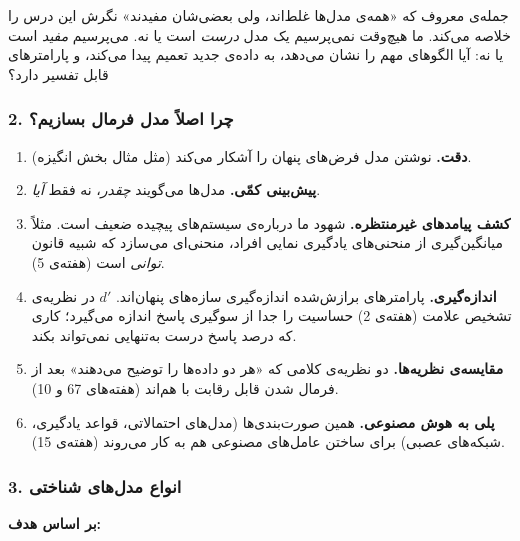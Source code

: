 جمله‌ی معروف  که «همه‌ی مدل‌ها غلط‌اند، ولی بعضی‌شان مفیدند»
نگرش این درس را خلاصه می‌کند. ما هیچ‌وقت نمی‌پرسیم یک مدل \emph{درست} است
یا نه. می‌پرسیم \emph{مفید} است یا نه: آیا الگوهای مهم را نشان می‌دهد، به
داده‌ی جدید تعمیم پیدا می‌کند، و پارامترهای قابل تفسیر دارد؟

\subsubsection{2. چرا اصلاً مدل فرمال بسازیم؟}

\begin{enumerate}
\def\labelenumi{\arabic{enumi}.}
\tightlist
\item
  \textbf{دقت.} نوشتن مدل فرض‌های پنهان را آشکار می‌کند (مثل مثال بخش
  انگیزه).
\item
  \textbf{پیش‌بینی کمّی.} مدل‌ها می‌گویند \emph{چقدر}، نه فقط \emph{آیا}.
\item
  \textbf{کشف پیامدهای غیرمنتظره.} شهود ما درباره‌ی سیستم‌های پیچیده ضعیف
  است. مثلاً میانگین‌گیری از منحنی‌های یادگیری نمایی افراد، منحنی‌ای می‌سازد
  که شبیه قانون \emph{توانی} است (هفته‌ی 5).
\item
  \textbf{اندازه‌گیری.} پارامترهای برازش‌شده اندازه‌گیری سازه‌های پنهان‌اند.
  \(d'\) در نظریه‌ی تشخیص علامت (هفته‌ی 2) حساسیت را جدا از سوگیری پاسخ
  اندازه می‌گیرد؛ کاری که درصد پاسخ درست به‌تنهایی نمی‌تواند بکند.
\item
  \textbf{مقایسه‌ی نظریه‌ها.} دو نظریه‌ی کلامی که «هر دو داده‌ها را توضیح
  می‌دهند» بعد از فرمال شدن قابل رقابت با هم‌اند (هفته‌های 6\lr{--}7 و 10).
\item
  \textbf{پلی به هوش مصنوعی.} همین صورت‌بندی‌ها (مدل‌های احتمالاتی، قواعد
  یادگیری، شبکه‌های عصبی) برای ساختن عامل‌های مصنوعی هم به کار می‌روند
  (هفته‌ی 15).
\end{enumerate}

\subsubsection{3. انواع مدل‌های شناختی}

\textbf{بر اساس هدف:}

